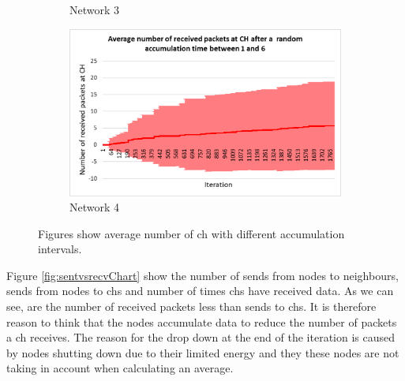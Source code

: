 \documentclass[USenglish]{uit-thesis}
\begin{document}
\begin{figure}
\begin{subfigure}[b]{0.475\textwidth}
            \caption[]%
            {{\small Network 3}}    
            \label{fig:recvfig3}
        \end{subfigure}
        \quad
        \begin{subfigure}[b]{0.475\textwidth}   
            \centering 
            \includegraphics[width=\textwidth]{RecvPkt_stdev_rand.png}
            \caption[]%
            {{\small Network 4}}    
            \label{fig:recvfig4}
        \end{subfigure}
        \caption[Figures show average number of \gls{ch} with different accumulation intervals.]
        {\small Figures show average number of \gls{ch} with different accumulation intervals.} 
        \label{fig:recPktChart}
    \end{figure}




Figure \ref{fig:sentvsrecvChart} show the number of sends from nodes to neighbours, sends from nodes to \glspl{ch} and number of times \glspl{ch} have received data. As we can see, are the number of received packets less than sends to \glspl{ch}. It is therefore reason to think that the nodes accumulate data to reduce the number of packets a \gls{ch} receives. The reason for the drop down at the end of the iteration is caused by nodes shutting down due to their limited energy and they these nodes are not taking in account when calculating an average.


\end{document}

